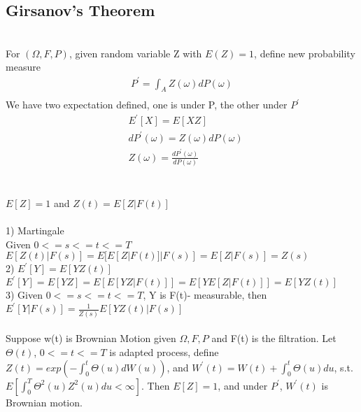 \documentclass[a4paper]{article}
\begin{document}
\subsection{Girsanov's Theorem}
\\
For $(\Omega, F, P)$, given random variable Z with $E(Z) = 1$, define new probability measure
\begin{align}
	P^{'} = \int_A Z(\omega) dP(\omega)\\
\end{align}
We have two expectation defined, one is under P, the other under $P^{'}$
\begin{align*}
	&E^{'}[X] = E[XZ]\\ 
	&dP^{'}(\omega) = Z(\omega) dP(\omega)\\
	&Z(\omega) = \frac{dP^{'}(\omega)}{dP(\omega)}\\
\end{align*}

\\
$E[Z] = 1$ and $Z(t) = E[Z|F(t)]$\\

\\
1) Martingale\\
Given $0 <= s <=t <= T$\\
$E[Z(t)|F(s)] = E[E[Z|F(t)]|F(s)] = E[Z|F(s)] = Z(s)$\\
2) $E^{'}[Y] = E[YZ(t)]$\\
$E^{'}[Y]=E[YZ] = E[E[YZ|F(t)]]=E[Y E[Z|F(t)]] = E[YZ(t)]$\\
3) Given $0<=s<=t<=T$, Y is F(t)- measurable, then\\
$E^{'}[Y|F(s)] = \frac{1}{Z(s)} E[YZ(t)|F(s)]$\\

\\
Suppose w(t) is Brownian Motion given $\Omega, F, P$ and F(t) is the filtration. Let $\Theta(t)$, $0<=t<=T$ is adapted process, define $Z(t) = exp(-\int_0^{t} \Theta(u) dW(u))$, and $W^{'}(t) = W(t) + \int_0^t \Theta(u) du$, s.t. $E[\int_0^T \Theta^2(u) Z^2(u) du < \infty]$. Then $E[Z]=1$, and under $P^{'}$, $W^{'}(t)$ is Brownian motion.\\
\end{document}
